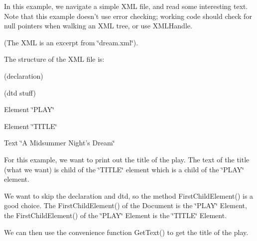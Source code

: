  In this example, we navigate a simple X\+M\+L file, and read some interesting text. Note that this example doesn't use error checking; working code should check for null pointers when walking an X\+M\+L tree, or use X\+M\+L\+Handle.

(The X\+M\+L is an excerpt from \char`\"{}dream.\+xml\char`\"{}).


\begin{DoxyCodeInclude}

\end{DoxyCodeInclude}


The structure of the X\+M\+L file is\+:


\begin{DoxyItemize}
\item (declaration) 
\item (dtd stuff) 
\item Element \char`\"{}\+P\+L\+A\+Y\char`\"{} 
\begin{DoxyItemize}
\item Element \char`\"{}\+T\+I\+T\+L\+E\char`\"{} 
\begin{DoxyItemize}
\item Text \char`\"{}\+A Midsummer Night's Dream\char`\"{} 
\end{DoxyItemize}
\end{DoxyItemize}
\end{DoxyItemize}

For this example, we want to print out the title of the play. The text of the title (what we want) is child of the \char`\"{}\+T\+I\+T\+L\+E\char`\"{} element which is a child of the \char`\"{}\+P\+L\+A\+Y\char`\"{} element.

We want to skip the declaration and dtd, so the method First\+Child\+Element() is a good choice. The First\+Child\+Element() of the Document is the \char`\"{}\+P\+L\+A\+Y\char`\"{} Element, the First\+Child\+Element() of the \char`\"{}\+P\+L\+A\+Y\char`\"{} Element is the \char`\"{}\+T\+I\+T\+L\+E\char`\"{} Element.


\begin{DoxyCodeInclude}

\end{DoxyCodeInclude}


We can then use the convenience function Get\+Text() to get the title of the play.


\begin{DoxyCodeInclude}

\end{DoxyCodeInclude}


